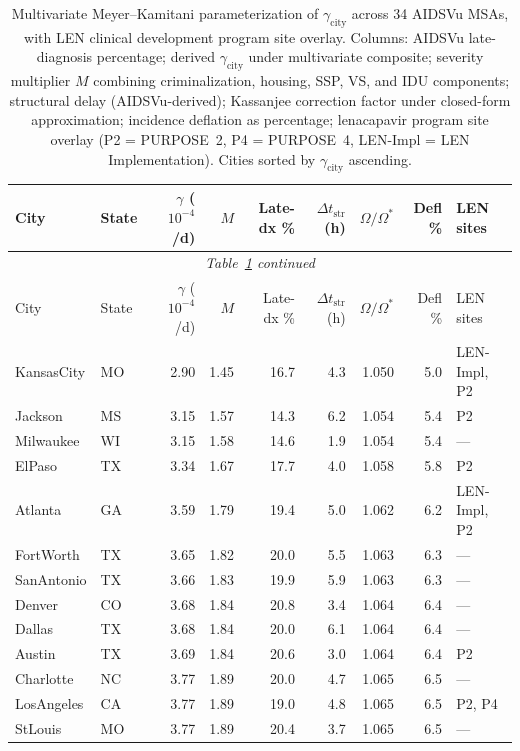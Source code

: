 \documentclass[11pt]{article}
\begin{document}
\begin{longtable}{llrrrrrrl}
\caption{Multivariate Meyer--Kamitani parameterization of $\gamma_{\mathrm{city}}$ across 34 AIDSVu MSAs, with LEN clinical development program site overlay. Columns: AIDSVu late-diagnosis percentage; derived $\gamma_{\mathrm{city}}$ under multivariate composite; severity multiplier $M$ combining criminalization, housing, SSP, VS, and IDU components; structural delay (AIDSVu-derived); Kassanjee correction factor under closed-form approximation; incidence deflation as percentage; lenacapavir program site overlay (P2 = PURPOSE~2, P4 = PURPOSE~4, LEN-Impl = LEN Implementation). Cities sorted by $\gamma_{\mathrm{city}}$ ascending.}
\label{tab:gamma_multivariate} \\
\toprule
City & State & $\gamma$ ($10^{-4}$/d) & $M$ & Late-dx \% & $\Delta t_{\mathrm{str}}$ (h) & $\Omega/\Omega^*$ & Defl \% & LEN sites \\
\midrule
\endfirsthead
\multicolumn{9}{c}{\textit{Table~\ref{tab:gamma_multivariate} continued}} \\
\toprule
City & State & $\gamma$ ($10^{-4}$/d) & $M$ & Late-dx \% & $\Delta t_{\mathrm{str}}$ (h) & $\Omega/\Omega^*$ & Defl \% & LEN sites \\
\midrule
\endhead
\bottomrule
\endfoot
KansasCity & MO & 2.90 & 1.45 & 16.7 & 4.3 & 1.050 & 5.0 & LEN-Impl, P2 \\
Jackson & MS & 3.15 & 1.57 & 14.3 & 6.2 & 1.054 & 5.4 & P2 \\
Milwaukee & WI & 3.15 & 1.58 & 14.6 & 1.9 & 1.054 & 5.4 & --- \\
ElPaso & TX & 3.34 & 1.67 & 17.7 & 4.0 & 1.058 & 5.8 & P2 \\
Atlanta & GA & 3.59 & 1.79 & 19.4 & 5.0 & 1.062 & 6.2 & LEN-Impl, P2 \\
FortWorth & TX & 3.65 & 1.82 & 20.0 & 5.5 & 1.063 & 6.3 & --- \\
SanAntonio & TX & 3.66 & 1.83 & 19.9 & 5.9 & 1.063 & 6.3 & --- \\
Denver & CO & 3.68 & 1.84 & 20.8 & 3.4 & 1.064 & 6.4 & --- \\
Dallas & TX & 3.68 & 1.84 & 20.0 & 6.1 & 1.064 & 6.4 & --- \\
Austin & TX & 3.69 & 1.84 & 20.6 & 3.0 & 1.064 & 6.4 & P2 \\
Charlotte & NC & 3.77 & 1.89 & 20.0 & 4.7 & 1.065 & 6.5 & --- \\
LosAngeles & CA & 3.77 & 1.89 & 19.0 & 4.8 & 1.065 & 6.5 & P2, P4 \\
StLouis & MO & 3.77 & 1.89 & 20.4 & 3.7 & 1.065 & 6.5 & --- \\

\end{longtable}
\end{document}

